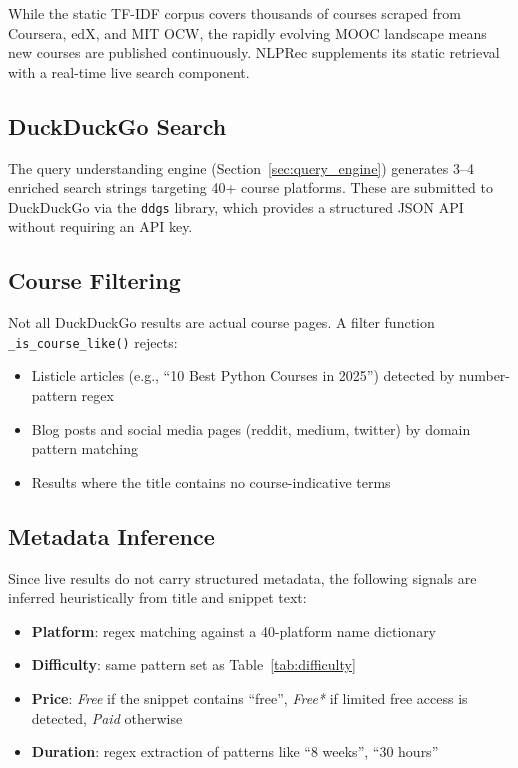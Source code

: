 \documentclass[12pt, a4paper]{article}
\begin{document}
While the static TF-IDF corpus covers thousands of courses scraped from Coursera, edX, and MIT
OCW, the rapidly evolving MOOC landscape means new courses are published continuously.
NLPRec supplements its static retrieval with a real-time live search component.

\subsection{DuckDuckGo Search}

The query understanding engine (Section~\ref{sec:query_engine}) generates 3–4 enriched search
strings targeting 40+ course platforms. These are submitted to DuckDuckGo via the \texttt{ddgs}
library, which provides a structured JSON API without requiring an API key.

\subsection{Course Filtering}

Not all DuckDuckGo results are actual course pages. A filter function \texttt{\_is\_course\_like()}
rejects:
\begin{itemize}
    \item Listicle articles (e.g., ``10 Best Python Courses in 2025'') detected by number-pattern
    regex
    \item Blog posts and social media pages (reddit, medium, twitter) by domain pattern matching
    \item Results where the title contains no course-indicative terms
\end{itemize}

\subsection{Metadata Inference}

Since live results do not carry structured metadata, the following signals are inferred
heuristically from title and snippet text:
\begin{itemize}
    \item \textbf{Platform}: regex matching against a 40-platform name dictionary
    \item \textbf{Difficulty}: same pattern set as Table~\ref{tab:difficulty}
    \item \textbf{Price}: \textit{Free} if the snippet contains ``free'', \textit{Free*} if
    limited free access is detected, \textit{Paid} otherwise
    \item \textbf{Duration}: regex extraction of patterns like ``8 weeks'', ``30 hours''
\end{itemize}
\end{document}

